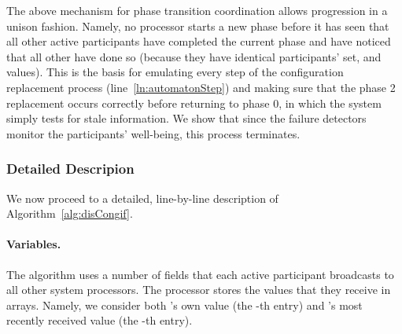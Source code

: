\documentclass[11pt]{article}
\begin{document}
The above mechanism for phase transition coordination allows progression in a unison fashion. Namely, no processor starts a new phase before it has seen that all other active participants have completed the current phase and have noticed that all other have done so (because they have identical participants' set,  and  values). This is the basis for emulating every step of the configuration replacement process (line~\ref{ln:automatonStep}) and making sure that the phase 2 replacement occurs correctly before returning to phase 0, in which the system simply tests for stale information. We show that since the failure detectors monitor the participants' well-being, this process terminates.


\subsubsection*{Detailed Descripion}

We now proceed to a detailed, line-by-line description of Algorithm~\ref{alg:disCongif}.

\paragraph{Variables.}
The algorithm uses a number of fields
that each active participant broadcasts to all other system processors. The processor stores the values that they receive in arrays. Namely, we consider both 's own value (the -th entry) and 's most recently received value (the -th entry).  
\end{document}
